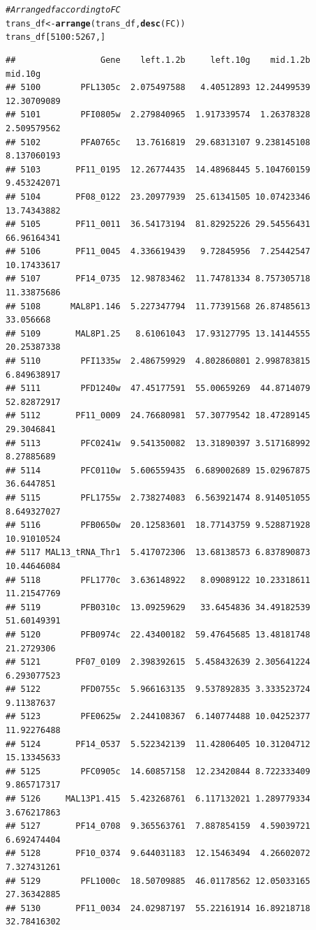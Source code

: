 \documentclass[12pt, a4paper]{article}\usepackage[]{graphicx}\usepackage[]{color}
\makeatletter
\newcommand{\hlnum}[1]{\textcolor[rgb]{0.686,0.059,0.569}{#1}}%
\newcommand{\hlcom}[1]{\textcolor[rgb]{0.678,0.584,0.686}{\textit{#1}}}%
\newcommand{\hlopt}[1]{\textcolor[rgb]{0,0,0}{#1}}%
\newcommand{\hlstd}[1]{\textcolor[rgb]{0.345,0.345,0.345}{#1}}%
\newcommand{\hlkwb}[1]{\textcolor[rgb]{0.69,0.353,0.396}{#1}}%
\newcommand{\hlkwd}[1]{\textcolor[rgb]{0.737,0.353,0.396}{\textbf{#1}}}%
\newenvironment{kframe}{%
 \def\at@end@of@kframe{}%
 \ifinner\ifhmode%
  \def\at@end@of@kframe{\end{minipage}}%
  \begin{minipage}{\columnwidth}%
 \fi\fi%
 \def\FrameCommand##1{\hskip\@totalleftmargin \hskip-\fboxsep
 \colorbox{shadecolor}{##1}\hskip-\fboxsep
     \hskip-\linewidth \hskip-\@totalleftmargin \hskip\columnwidth}%
 \MakeFramed {\advance\hsize-\width
   \@totalleftmargin\z@ \linewidth\hsize
   \@setminipage}}%
 {\par\unskip\endMakeFramed%
 \at@end@of@kframe}
\newenvironment{knitrout}{}{} %
\makeatother
\begin{document}
\begin{knitrout}
\begin{kframe}
\begin{alltt}
\hlcom{#Arrange df according to FC}
\hlstd{trans_df} \hlkwb{<-} \hlkwd{arrange}\hlstd{(trans_df,} \hlkwd{desc}\hlstd{(FC))}
\hlstd{trans_df[}\hlnum{5100}\hlopt{:}\hlnum{5267}\hlstd{,]}
\end{alltt}
\begin{verbatim}
##                 Gene    left.1.2b     left.10g    mid.1.2b     mid.10g
## 5100        PFL1305c  2.075497588   4.40512893 12.24499539 12.30709089
## 5101        PFI0805w  2.279840965  1.917339574  1.26378328 2.509579562
## 5102        PFA0765c   13.7616819  29.68313107 9.238145108 8.137060193
## 5103       PF11_0195  12.26774435  14.48968445 5.104760159 9.453242071
## 5104       PF08_0122  23.20977939  25.61341505 10.07423346 13.74343882
## 5105       PF11_0011  36.54173194  81.82925226 29.54556431 66.96164341
## 5106       PF11_0045  4.336619439   9.72845956  7.25442547 10.17433617
## 5107       PF14_0735  12.98783462  11.74781334 8.757305718 11.33875686
## 5108      MAL8P1.146  5.227347794  11.77391568 26.87485613   33.056668
## 5109       MAL8P1.25   8.61061043  17.93127795 13.14144555 20.25387338
## 5110        PFI1335w  2.486759929  4.802860801 2.998783815 6.849638917
## 5111        PFD1240w  47.45177591  55.00659269  44.8714079 52.82872917
## 5112       PF11_0009  24.76680981  57.30779542 18.47289145  29.3046841
## 5113        PFC0241w  9.541350082  13.31890397 3.517168992  8.27885689
## 5114        PFC0110w  5.606559435  6.689002689 15.02967875  36.6447851
## 5115        PFL1755w  2.738274083  6.563921474 8.914051055 8.649327027
## 5116        PFB0650w  20.12583601  18.77143759 9.528871928 10.91010524
## 5117 MAL13_tRNA_Thr1  5.417072306  13.68138573 6.837890873 10.44646084
## 5118        PFL1770c  3.636148922   8.09089122 10.23318611 11.21547769
## 5119        PFB0310c  13.09259629   33.6454836 34.49182539 51.60149391
## 5120        PFB0974c  22.43400182  59.47645685 13.48181748  21.2729306
## 5121       PF07_0109  2.398392615  5.458432639 2.305641224 6.293077523
## 5122        PFD0755c  5.966163135  9.537892835 3.333523724  9.11387637
## 5123        PFE0625w  2.244108367  6.140774488 10.04252377 11.92276488
## 5124       PF14_0537  5.522342139  11.42806405 10.31204712 15.13345633
## 5125        PFC0905c  14.60857158  12.23420844 8.722333409 9.865717317
## 5126     MAL13P1.415  5.423268761  6.117132021 1.289779334 3.676217863
## 5127       PF14_0708  9.365563761  7.887854159  4.59039721 6.692474404
## 5128       PF10_0374  9.644031183  12.15463494  4.26602072 7.327431261
## 5129        PFL1000c  18.50709885  46.01178562 12.05033165 27.36342885
## 5130       PF11_0034  24.02987197  55.22161914 16.89218718 32.78416302

\end{verbatim}
\end{kframe}
\end{knitrout}
\end{document}
